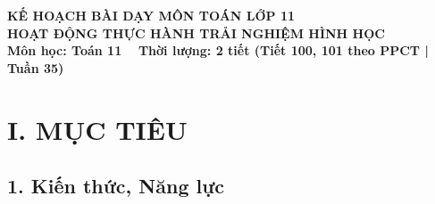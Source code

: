 \documentclass[12pt, a4paper]{article}
\begin{document}
\begin{center}
    {\fontsize{14pt}{17pt}\selectfont \textbf{KẾ HOẠCH BÀI DẠY MÔN TOÁN LỚP 11}}\\[6pt]
    {\fontsize{16pt}{19pt}\selectfont \textbf{HOẠT ĐỘNG THỰC HÀNH TRẢI NGHIỆM HÌNH HỌC}}\\[4pt]
    {\fontsize{12pt}{15pt}\selectfont \textbf{Môn học: Toán 11} \ \textbar \ \textbf{Thời lượng: 2 tiết (Tiết 100, 101 theo PPCT | Tuần 35)}}
\end{center}

\vspace{5pt}

\section*{I. MỤC TIÊU}

\subsection*{1. Kiến thức, Năng lực}
\end{document}
